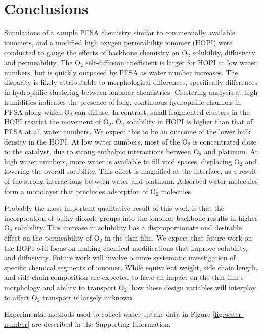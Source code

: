 \documentclass[journal=jacsat,manuscript=article]{achemso}
\begin{document}
\section{Conclusions}
Simulations of a sample PFSA chemistry similar to commercially available ionomers, and a modified high oxygen permeability ionomer (HOPI) were conducted to gauge the effects of backbone chemistry on O$_2$ solubility, diffusivity and permeability. The O$_2$ self-diffusion coefficient is larger for HOPI at low water numbers, but is quickly outpaced by PFSA as water number increases. The disparity is likely attributable to morphological differences, specifically differences in hydrophilic clustering between ionomer chemistries. Clustering analysis at high humidities indicates the presence of long, continuous hydrophilic channels in PFSA along which O$_2$ can diffuse. In contrast, small fragmented clusters in the HOPI restrict the movement of O$_2$. O$_2$ solubility in HOPI is higher than that of PFSA at all water numbers. We expect this to be an outcome of the lower bulk density in the HOPI. At low water numbers, most of the O$_2$ is concentrated close to the catalyst, due to strong enthalpic interactions between O$_2$ and platinum. At high water numbers, more water is available to fill void spaces, displacing O$_2$ and lowering the overall solubility. This effect is magnified at the interface, as a result of the strong interactions between water and platinum. Adsorbed water molecules form a monolayer that precludes adsorption of O$_2$ molecules. 

Probably the most important qualitative result of this work is that the incorporation of bulky dioxole groups into the ionomer backbone results in higher O$_2$ solubility. This increase in solubility has a disproportionate and desirable effect on the permeability of O$_2$ in the thin film. We expect that future work on the HOPI will focus on making chemical modifications that improve solubility, and diffusivity. Future work will involve a more systematic investigation of specific chemical segments of ionomer. While equivalent weight, side chain length, and side chain composition are expected to have an impact on the thin film's morphology and ability to transport O$_2$, how these design variables will interplay to affect O$_2$ transport is largely unknown. 

\begin{suppinfo}
Experimental methods used to collect water uptake data in Figure \ref{fig:water-number} are described in the Supporting Information.
\end{suppinfo}


\end{document}
